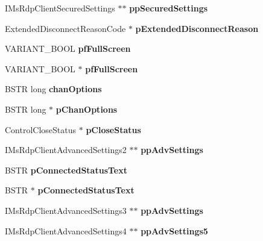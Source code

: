 \begin{DoxyCompactItemize}
I\+Ms\+Rdp\+Client\+Secured\+Settings $\ast$$\ast$ {\bfseries pp\+Secured\+Settings}
\item 
\mbox{\label{struct_i_ms_rdp_client4_vtbl_a103e41725bb3734d0f6f3969033181d6}} 
Extended\+Disconnect\+Reason\+Code $\ast$ {\bfseries p\+Extended\+Disconnect\+Reason}
\item 
\mbox{\label{struct_i_ms_rdp_client4_vtbl_a0b5f12ea6732c744b818af0c2e5c26db}} 
V\+A\+R\+I\+A\+N\+T\+\_\+\+B\+O\+OL {\bfseries pf\+Full\+Screen}
\item 
\mbox{\label{struct_i_ms_rdp_client4_vtbl_aad00a9e6254159213ef7cccfb76f58f0}} 
V\+A\+R\+I\+A\+N\+T\+\_\+\+B\+O\+OL $\ast$ {\bfseries pf\+Full\+Screen}
\item 
\mbox{\label{struct_i_ms_rdp_client4_vtbl_aa4969d09248bfe1aed015881d3acd3b8}} 
B\+S\+TR long {\bfseries chan\+Options}
\item 
\mbox{\label{struct_i_ms_rdp_client4_vtbl_a16ace7fc1c992315231508265d3d111a}} 
B\+S\+TR long $\ast$ {\bfseries p\+Chan\+Options}
\item 
\mbox{\label{struct_i_ms_rdp_client4_vtbl_a0858d5eefb5361a1b13b600ddf6e19c8}} 
Control\+Close\+Status $\ast$ {\bfseries p\+Close\+Status}
\item 
\mbox{\label{struct_i_ms_rdp_client4_vtbl_afe064b2813ab4ea27cf8f4e09b064d3a}} 
I\+Ms\+Rdp\+Client\+Advanced\+Settings2 $\ast$$\ast$ {\bfseries pp\+Adv\+Settings}
\item 
\mbox{\label{struct_i_ms_rdp_client4_vtbl_a22d4f203caf73d6e3e2246057041b82e}} 
B\+S\+TR {\bfseries p\+Connected\+Status\+Text}
\item 
\mbox{\label{struct_i_ms_rdp_client4_vtbl_a9a6beb4f04b2b1cb3b097e30021dd696}} 
B\+S\+TR $\ast$ {\bfseries p\+Connected\+Status\+Text}
\item 
\mbox{\label{struct_i_ms_rdp_client4_vtbl_ada725ace995b9f7aec00f5d68c4f2f7d}} 
I\+Ms\+Rdp\+Client\+Advanced\+Settings3 $\ast$$\ast$ {\bfseries pp\+Adv\+Settings}
\item 
\mbox{\label{struct_i_ms_rdp_client4_vtbl_a488c99dd31cfaf84a17a3f948cef4364}} 
I\+Ms\+Rdp\+Client\+Advanced\+Settings4 $\ast$$\ast$ {\bfseries pp\+Adv\+Settings5}
\end{DoxyCompactItemize}


